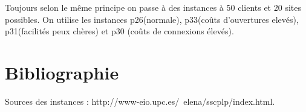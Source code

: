 \documentclass[12pt,a4paper]{article}
\begin{document}
Toujours selon le même principe on passe à des instances à 50 clients et 20 sites possibles. On utilise les instances p26(normale), p33(coûts d'ouvertures elevés), p31(facilités peux chères) et p30 (coûts de connexions élevés).\\

\section*{Bibliographie}
Sources des instances : http://www-eio.upc.es/~elena/sscplp/index.html.\\
\end{document}
